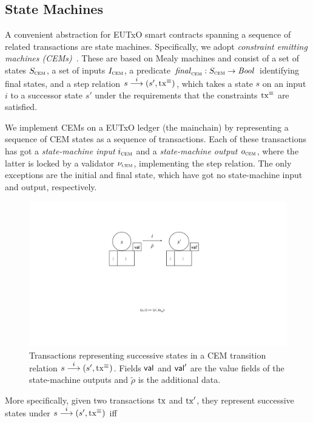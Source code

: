 \subsection{State Machines}
A convenient abstraction for EUTxO smart contracts spanning a sequence
of related transactions are state machines. Specifically, we adopt
\emph{constraint emitting machines (CEMs)}~\cite{eutxo}. These are
based on Mealy machines and consist of a set of states $S_{\textsc{cem}}$, a set
of inputs $I_{\textsc{cem}}$, a predicate \(\mathit{final}_{\textsc{cem}} : S_{\textsc{cem}}\to\mathit{Bool}\)
identifying final states, and a step relation
\({s}\overset{i}\longrightarrow(s', \mathrm{tx}^\equiv)\), which takes a state $s$ on an
input $i$ to a successor state $s'$ under the requirements that the
constraints $\mathrm{tx}^\equiv$ are satisfied.

We implement CEMs on a EUTxO ledger (the mainchain) by representing a sequence of CEM states as a sequence of transactions. Each of these transactions has got a \emph{state-machine input} $i_{\textsc{cem}}$ and a \emph{state-machine output} $o_{\textsc{cem}}$, where the latter is locked by a validator $\nu_{\textsc{cem}}$, implementing the step relation. The only exceptions are the initial and final state, which have got no state-machine input and output, respectively.

\begin{figure}[t]
  \centering
  \includegraphics[scale=.2,width=\textwidth/2]{figures/state-transition_cropped.pdf}
  \caption{Transactions representing successive states in a CEM
    transition relation \({s}\overset{i}\longrightarrow(s', \mathrm{tx}^\equiv)\).  Fields
    $\mathsf{val}$ and $\mathsf{val}'$ are the value fields of the state-machine
    outputs and $\tilde \rho$ is the additional data.}
  \label{fig:state-transition}
\end{figure}

More specifically, given two transactions $\mathrm{tx}$ and $\mathrm{tx}'$, they represent successive states under \({s}\overset{i}\longrightarrow(s', \mathrm{tx}^\equiv)\) iff 

